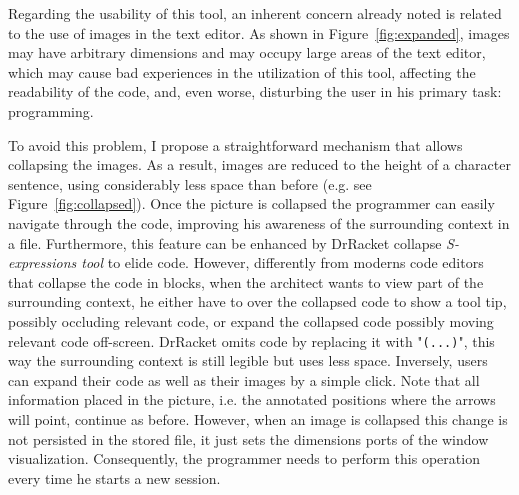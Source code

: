 \begin{figure}[!h]
\begin{minipage}[t]{.495\textwidth}
  \label{fig:ortocone2}
\end{minipage}
\end{figure}

Regarding the usability of this tool, an inherent concern already noted is related to the use of images in the text editor. As shown in Figure~\ref{fig:expanded}, images may have arbitrary dimensions and may occupy large areas of the text editor, which may cause bad experiences in the utilization of this tool, affecting the readability of the code, and, even worse, disturbing the user in his primary task: programming.

To avoid this problem, I propose a straightforward mechanism that allows collapsing the images. As a result, images are reduced to the height of a character sentence, using considerably less space than before (e.g. see Figure~\ref{fig:collapsed}). Once the picture is collapsed the programmer can easily navigate through the code, improving his awareness of the surrounding context in a file. Furthermore, this feature can be enhanced by DrRacket collapse \textit{S-expressions tool} to elide code. However, differently from moderns code editors that collapse the code in blocks, when the architect wants to view part of the surrounding context, he either have to over the collapsed code to show a tool tip, possibly occluding relevant code, or expand the collapsed code possibly moving relevant code off-screen. DrRacket omits code by replacing it with "\texttt{(...)}", this way the surrounding context is still legible but uses less space. Inversely, users can expand their code as well as their images by a simple click. Note that all information placed in the picture, i.e. the annotated positions where the arrows will point, continue as before. However, when an image is collapsed this change is not persisted in the stored file, it just sets the dimensions ports of the window visualization. Consequently, the programmer needs to perform this operation every time he starts a new session. 

